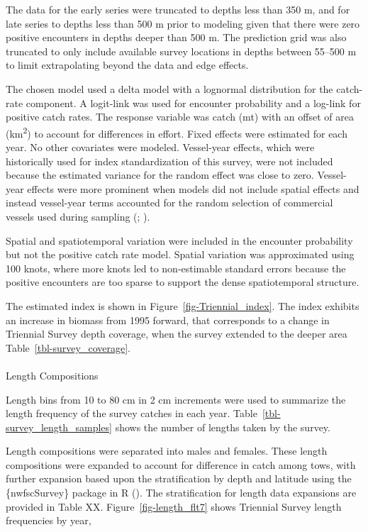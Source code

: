 \documentclass[
]{scrartcl}
\makeatletter
\let\oldparagraph\paragraph
\renewcommand{\paragraph}{
    \@ifstar
      \xxxParagraphStar
      \xxxParagraphNoStar
  }
\newcommand{\xxxParagraphStar}[1]{\oldparagraph*{#1}\mbox{}}
\newcommand{\xxxParagraphNoStar}[1]{\oldparagraph{#1}\mbox{}}
\makeatother
\begin{document}
The data for the early series were truncated to depths less than 350 m,
and for late series to depths less than 500 m prior to modeling given
that there were zero positive encounters in depths deeper than 500 m.
The prediction grid was also truncated to only include available survey
locations in depths between 55--500 m to limit extrapolating beyond the
data and edge effects.

The chosen model used a delta model with a lognormal distribution for
the catch-rate component. A logit-link was used for encounter
probability and a log-link for positive catch rates. The response
variable was catch (mt) with an offset of area (km\textsuperscript{2})
to account for differences in effort. Fixed effects were estimated for
each year. No other covariates were modeled. Vessel-year effects, which
were historically used for index standardization of this survey, were
not included because the estimated variance for the random effect was
close to zero. Vessel-year effects were more prominent when models did
not include spatial effects and instead vessel-year terms accounted for
the random selection of commercial vessels used during sampling
(;
).

Spatial and spatiotemporal variation were included in the encounter
probability but not the positive catch rate model. Spatial variation was
approximated using 100 knots, where more knots led to non-estimable
standard errors because the positive encounters are too sparse to
support the dense spatiotemporal structure.

The estimated index is shown in Figure~\ref{fig-Triennial_index}. The
index exhibits an increase in biomass from 1995 forward, that
corresponds to a change in Triennial Survey depth coverage, when the
survey extended to the deeper area Table~\ref{tbl-survey_coverage}.

\paragraph{Length Compositions}\label{length-compositions}

Length bins from 10 to 80 cm in 2 cm increments were used to summarize
the length frequency of the survey catches in each year.
Table~\ref{tbl-survey_length_samples} shows the number of lengths taken
by the survey.

Length compositions were separated into males and females. These length
compositions were expanded to account for difference in catch among
tows, with further expansion based upon the stratification by depth and
latitude using the \{nwfscSurvey\} package in R
(). The stratification for length data expansions are provided in
Table XX. Figure~\ref{fig-length_flt7} shows Triennial Survey length
frequencies by year,
\end{document}
